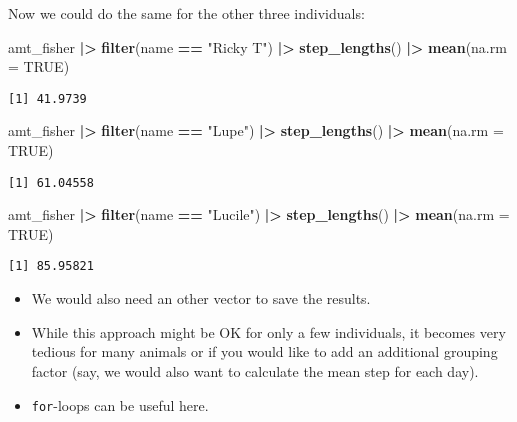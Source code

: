 \documentclass[ignorenonframetext,,t]{beamer}
\let\oldtextbf\textbf
\renewcommand{\textbf}[1]{\textcolor{spamwell}{\oldtextbf{#1}}}
\newenvironment{Shaded}{\begin{snugshade}}{\end{snugshade}}
\newcommand{\AttributeTok}[1]{\textcolor[rgb]{0.13,0.29,0.53}{#1}}
\newcommand{\ConstantTok}[1]{\textcolor[rgb]{0.56,0.35,0.01}{#1}}
\newcommand{\FunctionTok}[1]{\textcolor[rgb]{0.13,0.29,0.53}{\textbf{#1}}}
\newcommand{\NormalTok}[1]{#1}
\newcommand{\SpecialCharTok}[1]{\textcolor[rgb]{0.81,0.36,0.00}{\textbf{#1}}}
\newcommand{\StringTok}[1]{\textcolor[rgb]{0.31,0.60,0.02}{#1}}
\begin{document}
\begin{frame}[fragile]
Now we could do the same for the other three individuals:

\begin{Shaded}
\begin{Highlighting}[]
\NormalTok{amt\_fisher }\SpecialCharTok{|\textgreater{}} \FunctionTok{filter}\NormalTok{(name }\SpecialCharTok{==} \StringTok{"Ricky T"}\NormalTok{) }\SpecialCharTok{|\textgreater{}} 
  \FunctionTok{step\_lengths}\NormalTok{() }\SpecialCharTok{|\textgreater{}} \FunctionTok{mean}\NormalTok{(}\AttributeTok{na.rm =} \ConstantTok{TRUE}\NormalTok{)}
\end{Highlighting}
\end{Shaded}

\begin{verbatim}
[1] 41.9739
\end{verbatim}

\begin{Shaded}
\begin{Highlighting}[]
\NormalTok{amt\_fisher }\SpecialCharTok{|\textgreater{}} \FunctionTok{filter}\NormalTok{(name }\SpecialCharTok{==} \StringTok{"Lupe"}\NormalTok{) }\SpecialCharTok{|\textgreater{}} 
  \FunctionTok{step\_lengths}\NormalTok{() }\SpecialCharTok{|\textgreater{}} \FunctionTok{mean}\NormalTok{(}\AttributeTok{na.rm =} \ConstantTok{TRUE}\NormalTok{)}
\end{Highlighting}
\end{Shaded}

\begin{verbatim}
[1] 61.04558
\end{verbatim}

\begin{Shaded}
\begin{Highlighting}[]
\NormalTok{amt\_fisher }\SpecialCharTok{|\textgreater{}} \FunctionTok{filter}\NormalTok{(name }\SpecialCharTok{==} \StringTok{"Lucile"}\NormalTok{) }\SpecialCharTok{|\textgreater{}} 
  \FunctionTok{step\_lengths}\NormalTok{() }\SpecialCharTok{|\textgreater{}} \FunctionTok{mean}\NormalTok{(}\AttributeTok{na.rm =} \ConstantTok{TRUE}\NormalTok{)}
\end{Highlighting}
\end{Shaded}

\begin{verbatim}
[1] 85.95821
\end{verbatim}
\end{frame}

\begin{frame}[fragile]
\begin{itemize}
\item
  We would also need an other vector to save the results.
\item
  While this approach might be OK for only a few individuals, it becomes
  very tedious for many animals or if you would like to add an
  additional grouping factor (say, we would also want to calculate the
  mean step for each day).
\item
  \texttt{for}-loops can be useful here.
\end{itemize}
\end{frame}
\end{document}
